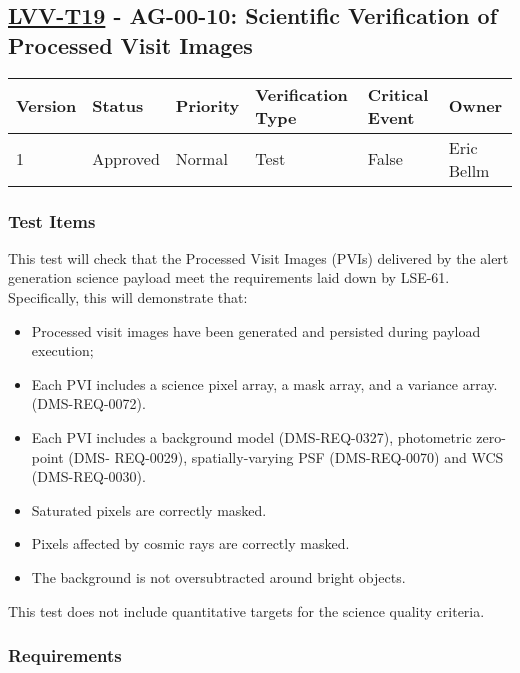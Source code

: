 \hypertarget{lvv-t19---ag-00-10-scientific-verification-of-processed-visit-images}{\subsection{\texorpdfstring{\href{https://jira.lsstcorp.org/secure/Tests.jspa\#/testCase/LVV-T19}{LVV-T19}
- AG-00-10: Scientific Verification of Processed Visit
Images}{LVV-T19 - AG-00-10: Scientific Verification of Processed Visit Images}}\label{lvv-t19---ag-00-10-scientific-verification-of-processed-visit-images}}

\begin{longtable}[]{@{}llllll@{}}
\toprule
Version & Status & Priority & Verification Type & Critical Event &
Owner\tabularnewline
\midrule
\endhead
1 & Approved & Normal & Test & False & Eric Bellm\tabularnewline
\bottomrule
\end{longtable}

\subsubsection{Test Items}\label{test-items-2}

This test will check that the Processed Visit Images (PVIs) delivered by
the alert generation science payload meet the requirements laid down by
LSE-61.\\
Specifically, this will demonstrate that:

\begin{itemize}
\tightlist
\item
  Processed visit images have been generated and persisted during
  payload execution;
\item
  Each PVI includes a science pixel array, a mask array, and a variance
  array. (DMS-REQ-0072).
\item
  Each PVI includes a background model (DMS-REQ-0327), photometric
  zero-point (DMS- REQ-0029), spatially-varying PSF (DMS-REQ-0070) and
  WCS (DMS-REQ-0030).
\item
  Saturated pixels are correctly masked.
\item
  Pixels affected by cosmic rays are correctly masked.
\item
  The background is not oversubtracted around bright objects.
\end{itemize}

This test does not include quantitative targets for the science quality
criteria.

\subsubsection{Requirements}\label{requirements-2}

